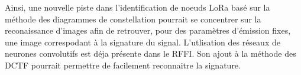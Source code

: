 \vspace{0.1cm}

Ainsi, une nouvelle piste dans l'identification de noeuds LoRa basé sur la méthode des diagrammes de constellation pourrait se concentrer sur la reconaissance d'images afin de retrouver, pour des paramètres d'émission fixes, une image correspodant à la signature du signal. L'utlisation des réseaux de neurones convolutifs est déja présente dans le \ac{RFFI}. Son ajout à la méthode des \ac{DCTF} pourrait permettre de facilement reconnaitre la signature.